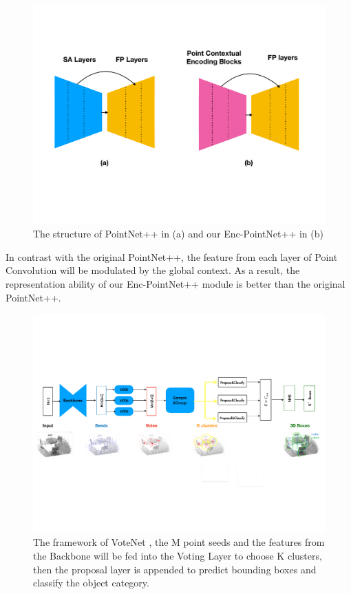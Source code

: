 \documentclass[runningheads]{llncs}
\begin{document}
\begin{figure}[t]
\begin{minipage}{1.0\textwidth}
    \centering
    \includegraphics[width=.8\linewidth]{eccv2020kit/Figure/enc_pointnet++.pdf}
    \caption{The structure of PointNet++ in (a) and our Enc-PointNet++ in (b) }
\end{minipage}
\label{fig:enc_pointnet}
\end{figure}

In contrast with the original PointNet++,  the feature from each layer of  Point Convolution will be modulated by the global context.  As a result, the representation ability of  our Enc-PointNet++ module is better than the original PointNet++. %

\begin{figure}[t]
\begin{minipage}{1.\textwidth}
    \centering
    \includegraphics[width=1.0\linewidth]{eccv2020kit/Figure/VoteNet.pdf}
    \caption{The framework of VoteNet \cite{VoteNet}, the M point seeds and the features from the Backbone will be fed into the Voting Layer to choose K clusters, then the proposal layer is appended to predict  bounding boxes and classify the object category. }
\end{minipage}
\label{fig:votenet}
\end{figure}
\end{document}
